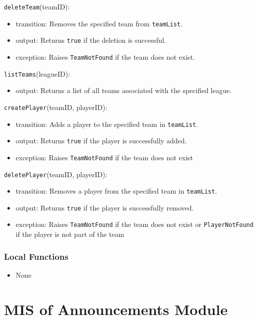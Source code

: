 \documentclass[12pt, titlepage]{article}
\begin{document}
\noindent \texttt{deleteTeam}(teamID):  
\begin{itemize}
    \item transition: Removes the specified team from \texttt{teamList}.
    \item output: Returns \texttt{true} if the deletion is successful.
    \item exception: Raises \texttt{TeamNotFound} if the team does not exist.
\end{itemize}

\noindent \texttt{listTeams}(leagueID):  
\begin{itemize}
    \item output: Returns a list of all teams associated with the specified league.
\end{itemize}

\noindent \texttt{createPlayer}(teamID, playerID):  
\begin{itemize}
    \item transition: Adds a player to the specified team in \texttt{teamList}.
    \item output: Returns \texttt{true} if the player is successfully added.
    \item exception: Raises \texttt{TeamNotFound} if the team does not exist
\end{itemize}

\noindent \texttt{deletePlayer}(teamID, playerID):  
\begin{itemize}
    \item transition: Removes a player from the specified team in \texttt{teamList}.
    \item output: Returns \texttt{true} if the player is successfully removed.
    \item exception: Raises \texttt{TeamNotFound} if the team does not exist or \texttt{PlayerNotFound} if the player is not part of the team
\end{itemize}
    
\subsubsection{Local Functions}
\begin{itemize}
    \item None
\end{itemize}

\section{MIS of Announcements Module} \label{AnnouncementsModule}
\end{document}
